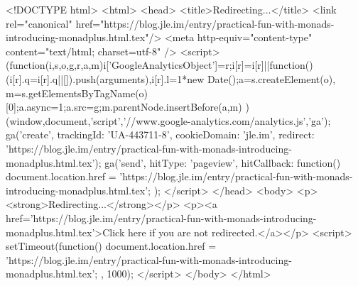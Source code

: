 <!DOCTYPE html>
<html>
<head>
<title>Redirecting...</title>
<link rel="canonical" href="https://blog.jle.im/entry/practical-fun-with-monads-introducing-monadplus.html.tex"/>
<meta http-equiv="content-type" content="text/html; charset=utf-8" />
<script>
(function(i,s,o,g,r,a,m){i['GoogleAnalyticsObject']=r;i[r]=i[r]||function(){
(i[r].q=i[r].q||[]).push(arguments)},i[r].l=1*new Date();a=s.createElement(o),
m=s.getElementsByTagName(o)[0];a.async=1;a.src=g;m.parentNode.insertBefore(a,m)
})(window,document,'script','//www.google-analytics.com/analytics.js','ga');
ga('create', { trackingId: 'UA-443711-8', cookieDomain: 'jle.im', redirect: 'https://blog.jle.im/entry/practical-fun-with-monads-introducing-monadplus.html.tex'});
ga('send', { hitType: 'pageview', hitCallback: function() { document.location.href = 'https://blog.jle.im/entry/practical-fun-with-monads-introducing-monadplus.html.tex'; } });
</script>
</head>
<body>
  <p><strong>Redirecting...</strong></p>
  <p><a href='https://blog.jle.im/entry/practical-fun-with-monads-introducing-monadplus.html.tex'>Click here if you are not redirected.</a></p>
  <script>
    setTimeout(function() { document.location.href = 'https://blog.jle.im/entry/practical-fun-with-monads-introducing-monadplus.html.tex'; }, 1000);
  </script>
</body>
</html>
